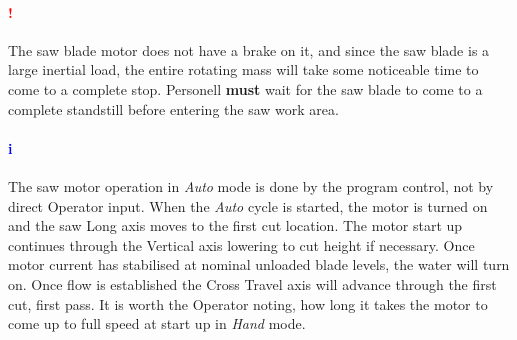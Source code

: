 \paragraph*{\textbf{{\LARGE \textcolor{red}{!}}}}The saw blade motor does not have a brake on it, and since the saw blade is a large inertial load, the entire rotating mass will take some noticeable time to come to a complete stop. Personell \textbf{must} wait for the saw blade to come to a complete standstill before entering the saw work area.
\paragraph*{\textbf{\LARGE \textcolor{blue}{i}}}The saw motor operation in \textit{Auto} mode is done by the program control, not by direct Operator input. When the \textit{Auto} cycle is started, the motor is turned on and the saw Long axis moves to the first cut location. The motor start up continues through the Vertical axis lowering to cut height if necessary. Once motor current has stabilised at nominal unloaded blade levels, the water will turn on. Once flow is established the Cross Travel axis will advance through the first cut, first pass. It is worth the Operator noting, how long it takes the motor to come up to full speed at start up in \textit{Hand} mode. 